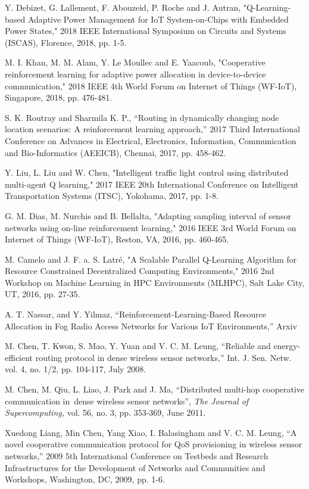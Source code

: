 \documentclass[journal]{IEEEtran}
\begin{document}
\begin{thebibliography}{1}
Y. Debizet, G. Lallement, F. Abouzeid, P. Roche and J. Autran, "Q-Learning-based Adaptive Power Management for IoT System-on-Chips with Embedded Power States," 2018 IEEE International Symposium on Circuits and Systems (ISCAS), Florence, 2018, pp. 1-5.

M. I. Khan, M. M. Alam, Y. Le Moullec and E. Yaacoub, "Cooperative reinforcement learning for adaptive power allocation in device-to-device communication," 2018 IEEE 4th World Forum on Internet of Things (WF-IoT), Singapore, 2018, pp. 476-481.

S. K. Routray and Sharmila K. P., ``Routing in dynamically changing node location scenarios: A reinforcement learning approach,'' 2017 Third International Conference on Advances in Electrical, Electronics, Information, Communication and Bio-Informatics (AEEICB), Chennai, 2017, pp. 458-462.

Y. Liu, L. Liu and W. Chen, "Intelligent traffic light control using distributed multi-agent Q learning," 2017 IEEE 20th International Conference on Intelligent Transportation Systems (ITSC), Yokohama, 2017, pp. 1-8.

G. M. Dias, M. Nurchis and B. Bellalta, "Adapting sampling interval of sensor networks using on-line reinforcement learning," 2016 IEEE 3rd World Forum on Internet of Things (WF-IoT), Reston, VA, 2016, pp. 460-465.

M. Camelo and J. F. a. S. Latré, "A Scalable Parallel Q-Learning Algorithm for Resource Constrained Decentralized Computing Environments," 2016 2nd Workshop on Machine Learning in HPC Environments (MLHPC), Salt Lake City, UT, 2016, pp. 27-35.

A. T. Nassar, and Y. Yilmaz, ``Reinforcement-Learning-Based Resource Allocation in Fog Radio Access Networks for Various IoT Environments,'' Arxiv

M. Chen, T. Kwon, S. Mao, Y. Yuan and V. C. M. Leung, ``Reliable and energy-efficient routing protocol in dense wireless sensor networks,'' Int. J. Sen. Netw.
 vol. 4, no. 1/2, pp. 104-117, July 2008.

M. Chen, M. Qiu, L. Liao, J. Park and J. Ma, ``Distributed multi-hop cooperative communication in dense wireless sensor networks'', \emph{The Journal of Supercomputing,} vol. 56, no. 3, pp. 353-369, June 2011.

Xuedong Liang, Min Chen, Yang Xiao, I. Balasingham and V. C. M. Leung, ``A novel cooperative communication protocol for QoS provisioning in wireless sensor networks,'' 2009 5th International Conference on Testbeds and Research Infrastructures for the Development of Networks and Communities and Workshops, Washington, DC, 2009, pp. 1-6.


\end{thebibliography}
\end{document}
